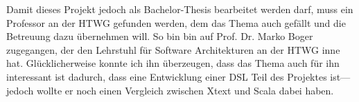 Damit dieses Projekt jedoch als Bachelor-Thesis bearbeitet werden darf,
muss ein Professor an der HTWG gefunden werden, dem das Thema auch gefällt
und die Betreuung dazu übernehmen will. So bin bin auf Prof. Dr. Marko
Boger zugegangen, der den Lehrstuhl für Software Architekturen an der HTWG
inne hat. Glücklicherweise konnte ich ihn überzeugen, dass das Thema auch
für ihn interessant ist dadurch, dass eine Entwicklung einer DSL Teil des
Projektes ist---jedoch wollte er noch einen Vergleich zwischen Xtext und Scala
dabei haben.
